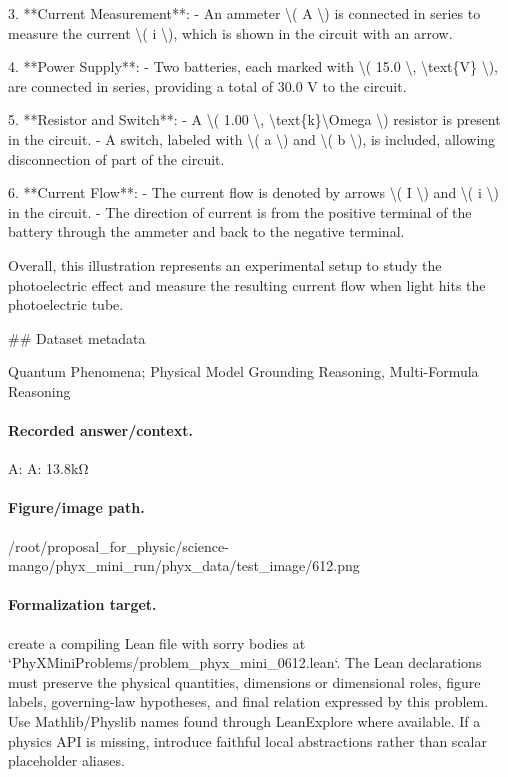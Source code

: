 3. **Current Measurement**:
   - An ammeter \textbackslash{}( A \textbackslash{}) is connected in series to measure the current \textbackslash{}( i \textbackslash{}), which is shown in the circuit with an arrow.

4. **Power Supply**:
   - Two batteries, each marked with \textbackslash{}( 15.0 \textbackslash{}, \textbackslash{}text\{V\} \textbackslash{}), are connected in series, providing a total of 30.0 V to the circuit.

5. **Resistor and Switch**:
   - A \textbackslash{}( 1.00 \textbackslash{}, \textbackslash{}text\{k\}\textbackslash{}Omega \textbackslash{}) resistor is present in the circuit.
   - A switch, labeled with \textbackslash{}( a \textbackslash{}) and \textbackslash{}( b \textbackslash{}), is included, allowing disconnection of part of the circuit.

6. **Current Flow**:
   - The current flow is denoted by arrows \textbackslash{}( I \textbackslash{}) and \textbackslash{}( i \textbackslash{}) in the circuit.
   - The direction of current is from the positive terminal of the battery through the ammeter and back to the negative terminal.

Overall, this illustration represents an experimental setup to study the photoelectric effect and measure the resulting current flow when light hits the photoelectric tube.

\#\# Dataset metadata

Quantum Phenomena; Physical Model Grounding Reasoning, Multi-Formula Reasoning

\paragraph{Recorded answer/context.}
A: A:  13.8kΩ

\paragraph{Figure/image path.}
/root/proposal\_for\_physic/science-mango/phyx\_mini\_run/phyx\_data/test\_image/612.png

\paragraph{Formalization target.}
create a compiling Lean file with sorry bodies at `PhyXMiniProblems/problem\_phyx\_mini\_0612.lean`. The Lean declarations must preserve the physical quantities, dimensions or dimensional roles, figure labels, governing-law hypotheses, and final relation expressed by this problem.
Use Mathlib/Physlib names found through LeanExplore where available. If a physics API is missing, introduce faithful local abstractions rather than scalar placeholder aliases.

